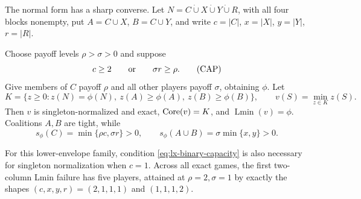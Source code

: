 The normal form has a sharp converse. Let
$N=C\mathbin{\dot\cup}X\mathbin{\dot\cup}Y\mathbin{\dot\cup}R$, with all
four blocks nonempty, put $A=C\cup X$, $B=C\cup Y$, and write
$c=|C|$, $x=|X|$, $y=|Y|$, $r=|R|$.

\begin{theorem}
\label{thm:lx-binary-diamond-realization}
Choose payoff levels $\rho>\sigma>0$ and suppose
\[
 c\geq2\qquad\hbox{or}\qquad \sigma r\geq\rho.      \tag{CAP}
 \label{eq:lx-binary-capacity}
\]
Give members of $C$ payoff $\rho$ and all other players payoff $\sigma$,
obtaining $\phi$. Let
\[
 K=\{z\geq0:z(N)=\phi(N),\ z(A)\geq\phi(A),\ z(B)\geq\phi(B)\},
 \qquad v(S)=\min_{z\in K}z(S).
\]
Then $v$ is singleton-normalized and exact, $\operatorname{Core}(v)=K$, and
$\operatorname{Lmin}(v)=\phi$. Coalitions $A,B$ are tight, while
\[
 s_\phi(C)=\min\{\rho c,\sigma r\}>0,
 \qquad
 s_\phi(A\cup B)=\sigma\min\{x,y\}>0.              \tag{BDR}
 \label{eq:lx-binary-diamond-slacks}
\]

For this lower-envelope family, condition \eqref{eq:lx-binary-capacity} is
also necessary for singleton normalization when $c=1$. Across all exact
games, the first two-column Lmin failure has five players, attained at
$\rho=2,\sigma=1$ by exactly the shapes
$(c,x,y,r)=(2,1,1,1)$ and $(1,1,1,2)$.
\end{theorem}

